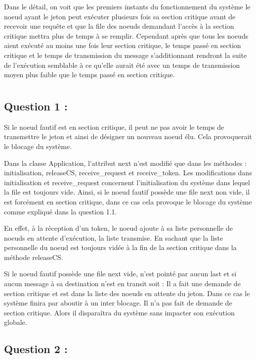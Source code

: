 \documentclass[11pt,a4paper]{report}
\begin{document}
Dans le détail, on voit que les premiers instants du fonctionnement du système le noeud ayant le jeton peut exécuter plusieurs fois sa section critique avant de recevoir une requête et que la file des noeuds demandant l'accès à la section critique mettra plus de temps à se remplir. Cependant après que tous les noeuds aient exécuté au moins une fois leur section critique, le temps passé en section critique et le temps de transmission du message s'additionnant rendront la suite de l'exécution semblable à ce qu'elle aurait été avec un temps de transmission moyen plus faible que le temps passé en section critique.


\chapter{}

\section{Question 1 :}

 Si le noeud fautif est en section critique, il peut ne pas avoir le temps de transmettre le jeton et ainsi de désigner un nouveau noeud élu. Cela provoquerait le blocage du système. 

 Dans la classe Application, l'attribut next n'est modifié que dans les méthodes : initialisation, releaseCS, receive_request et receive_token. Les modifications dans initialisation et receive_request concernent l'initialisation du système dans lequel la file est toujours vide. Ainsi, si le noeud fautif possède une file next non vide, il est forcément en section critique, dans ce cas cela provoque le blocage du système comme expliqué dans la question 1.1.

En effet, à la réception d'un token, le noeud ajoute à sa liste personnelle de noeuds en attente d'exécution, la liste transmise. En sachant que la liste personnelle du noeud est toujours vidée à la fin de la section critique dans la méthode releaseCS.

Si le noeud fautif possède une file next vide, n’est pointé par aucun last et si aucun message à sa destination n’est en transit soit :
 Il a fait une demande de section critique et est dans la liste des noeuds en attente du jeton. Dans ce cas le système finira par aboutir à un inter blocage.
 Il n'a pas fait de demande de section critique. Alors il disparaîtra du système sans impacter son exécution globale.


\section{Question 2 :}
\end{document}
